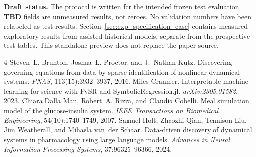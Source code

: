\documentclass[10pt]{article}
\begin{document}
\begingroup\small
\textbf{Draft status.} The protocol is written for the intended frozen test
evaluation. \textbf{TBD} fields are unmeasured results, not zeroes. No validation
numbers have been relabeled as test results. Section~\ref{sec:exp_specification_case}
contains measured exploratory results from assisted historical models, separate
from the prospective test tables. This standalone preview does not replace the
paper source.
\par\endgroup


\begin{thebibliography}{4}
Steven~L. Brunton, Joshua~L. Proctor, and J.~Nathan Kutz.
Discovering governing equations from data by sparse identification of nonlinear
dynamical systems. \emph{PNAS}, 113(15):3932--3937, 2016.
Miles Cranmer. Interpretable machine learning for science with PySR and
SymbolicRegression.jl. \emph{arXiv:2305.01582}, 2023.
Chiara Dalla Man, Robert~A. Rizza, and Claudio Cobelli.
Meal simulation model of the glucose-insulin system.
\emph{IEEE Transactions on Biomedical Engineering}, 54(10):1740--1749, 2007.
Samuel Holt, Zhaozhi Qian, Tennison Liu, Jim Weatherall, and Mihaela van~der Schaar.
Data-driven discovery of dynamical systems in pharmacology using large language
models. \emph{Advances in Neural Information Processing Systems},
37:96325--96366, 2024.
\end{thebibliography}
\clearpage
\appendix

\end{document}
